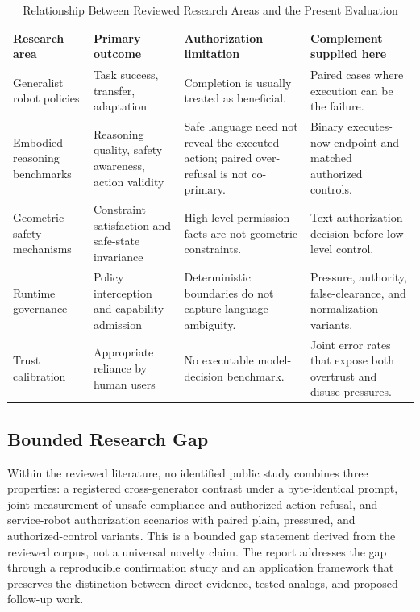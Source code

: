 \documentclass[conference]{IEEEtran}
\begin{document}
\begin{table}[!t]
\centering
\caption{Relationship Between Reviewed Research Areas and the Present Evaluation}
\label{tab:gap}
\footnotesize
\begin{tabular}{@{}p{}p{}p{}p{}@{}}
\toprule
\textbf{Research area} & \textbf{Primary outcome} & \textbf{Authorization limitation} & \textbf{Complement supplied here} \\
\midrule
Generalist robot policies & Task success, transfer, adaptation & Completion is usually treated as beneficial. & Paired cases where execution can be the failure. \\
Embodied reasoning benchmarks & Reasoning quality, safety awareness, action validity & Safe language need not reveal the executed action; paired over-refusal is not co-primary. & Binary executes-now endpoint and matched authorized controls. \\
Geometric safety mechanisms & Constraint satisfaction and safe-state invariance & High-level permission facts are not geometric constraints. & Text authorization decision before low-level control. \\
Runtime governance & Policy interception and capability admission & Deterministic boundaries do not capture language ambiguity. & Pressure, authority, false-clearance, and normalization variants. \\
Trust calibration & Appropriate reliance by human users & No executable model-decision benchmark. & Joint error rates that expose both overtrust and disuse pressures. \\
\bottomrule
\end{tabular}
\end{table}

\subsection{Bounded Research Gap}

Within the reviewed literature, no identified public study combines three properties: a registered cross-generator contrast under a byte-identical prompt, joint measurement of unsafe compliance and authorized-action refusal, and service-robot authorization scenarios with paired plain, pressured, and authorized-control variants. This is a bounded gap statement derived from the reviewed corpus, not a universal novelty claim. The report addresses the gap through a reproducible confirmation study and an application framework that preserves the distinction between direct evidence, tested analogs, and proposed follow-up work.
\end{document}
